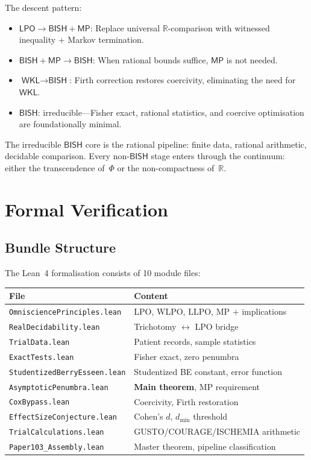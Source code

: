 \documentclass[11pt,a4paper]{article}
\theoremstyle{plain}
\theoremstyle{definition}
\newcommand{\BISH}{\textsf{BISH}}
\newcommand{\WKL}{\textsf{WKL}}
\newcommand{\LPO}{\textsf{LPO}}
\newcommand{\MP}{\textsf{MP}}
\newcommand{\R}{\mathbb{R}}
\renewcommand{\Phi}{\varPhi}
\begin{document}
The descent pattern:
\begin{itemize}[nosep]
\item $\LPO \to \BISH{+}\MP$: Replace universal $\R$-comparison with witnessed inequality + Markov termination.
\item $\BISH{+}\MP \to \BISH$: When rational bounds suffice, $\MP$ is not needed.
\item $\WKL \to \BISH$: Firth correction restores coercivity, eliminating the need for $\WKL$.
\item $\BISH$: irreducible---Fisher exact, rational statistics, and coercive optimisation are foundationally minimal.
\end{itemize}

The irreducible $\BISH$ core is the rational pipeline: finite data, rational arithmetic, decidable comparison.  Every non-$\BISH$ stage enters through the continuum: either the transcendence of~$\Phi$ or the non-compactness of~$\R$.

\section{Formal Verification}\label{sec:lean}

\subsection{Bundle Structure}

The Lean~4 formalisation consists of 10 module files:

\begin{center}
\begin{tabular}{@{}ll@{}}
\toprule
\textbf{File} & \textbf{Content} \\
\midrule
\texttt{OmnisciencePrinciples.lean} & LPO, WLPO, LLPO, MP + implications \\
\texttt{RealDecidability.lean} & Trichotomy $\leftrightarrow$ LPO bridge \\
\texttt{TrialData.lean} & Patient records, sample statistics \\
\texttt{ExactTests.lean} & Fisher exact, zero penumbra \\
\texttt{StudentizedBerryEsseen.lean} & Studentized BE constant, error function \\
\texttt{AsymptoticPenumbra.lean} & \textbf{Main theorem}, MP requirement \\
\texttt{CoxBypass.lean} & Coercivity, Firth restoration \\
\texttt{EffectSizeConjecture.lean} & Cohen's $d$, $d_{\min}$ threshold \\
\texttt{TrialCalculations.lean} & GUSTO/COURAGE/ISCHEMIA arithmetic \\
\texttt{Paper103\_Assembly.lean} & Master theorem, pipeline classification \\
\bottomrule
\end{tabular}
\end{center}
\end{document}
